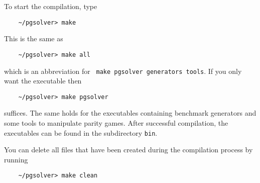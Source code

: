 



To start the compilation, type 
\begin{verbatim}
    ~/pgsolver> make
\end{verbatim}
This is the same as
\begin{verbatim}
    ~/pgsolver> make all
\end{verbatim}
which is an abbreviation for \verb# make pgsolver generators tools#. If you only want the executable \pgsolver then 
\begin{verbatim}
    ~/pgsolver> make pgsolver
\end{verbatim}
suffices. The same holds for the executables containing benchmark generators and some tools to manipulate parity games.
After successful compilation, the executables can be found in the
subdirectory \texttt{bin}.

You can delete all files that have been created during the compilation process by running
\begin{verbatim}
    ~/pgsolver> make clean
\end{verbatim}



